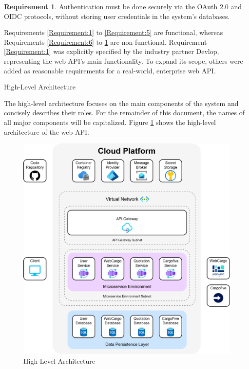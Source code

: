 \documentclass[12pt, reqno]{amsbook}
\makeatletter
\def\section{\@startsection{section}{1}%
      \z@{.5\linespacing\@plus.7\linespacing}{.25\linespacing}%
      {\normalfont\bfseries\flushleft}}
\theoremstyle{definition}
\theoremstyle{definition}
\newtheorem{requirement}{Requirement}
\numberwithin{section}{chapter}
\numberwithin{table}{chapter}
\numberwithin{figure}{chapter}
\makeatother
\begin{document}
\begin{requirement}
  \label{Requirement:12}
  Authentication must be done securely via the \ac{OAuth} 2.0 and \ac{OIDC} protocols, without storing user credentials in the system's databases.
\end{requirement}


Requirements \ref{Requirement:1} to \ref{Requirement:5} are functional, whereas Requirements \ref{Requirement:6} to \ref{Requirement:12} are non-functional. Requirement \ref{Requirement:1} was explicitly specified by the industry partner Devlop, representing the web \ac{API}'s main functionality. To expand its scope, others were added as reasonable requirements for a real-world, enterprise web \ac{API}.

\section{High-Level Architecture}
\label{Section:High_Level_Architecture}

The high-level architecture focuses on the main components of the system and concisely describes their roles. For the remainder of this document, the names of all major components will be capitalized. Figure \ref{Figure:High_Level_Architecture} shows the high-level architecture of the web \ac{API}.

\begin{figure}[H]
  \centering
  \includegraphics[width=1\linewidth]{images/HighLevelArchitecture.png}
  \caption{\label{Figure:High_Level_Architecture}High-Level Architecture}
\end{figure}
\end{document}
